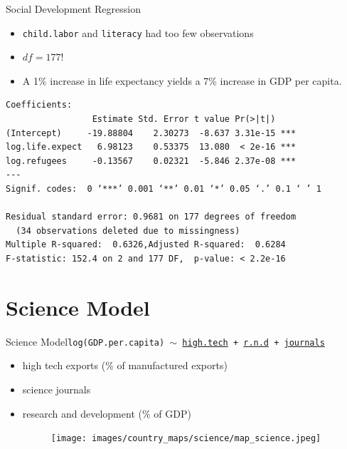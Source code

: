 \documentclass{beamer}
\begin{document}
\begin{frame}[fragile]{{\sc Social Development} Regression}
\small
\begin{itemize}
\item {\tt child.labor} and {\tt literacy} had too few observations
\item $df = 177$!
\item A 1\% increase in life expectancy yields a 7\% increase in GDP per capita.
\end{itemize}
\begin{verbatim}
Coefficients:
                 Estimate Std. Error t value Pr(>|t|)    
(Intercept)     -19.88804    2.30273  -8.637 3.31e-15 ***
log.life.expect   6.98123    0.53375  13.080  < 2e-16 ***
log.refugees     -0.13567    0.02321  -5.846 2.37e-08 ***
---
Signif. codes:  0 ‘***’ 0.001 ‘**’ 0.01 ‘*’ 0.05 ‘.’ 0.1 ‘ ’ 1

Residual standard error: 0.9681 on 177 degrees of freedom
  (34 observations deleted due to missingness)
Multiple R-squared:  0.6326,Adjusted R-squared:  0.6284 
F-statistic: 152.4 on 2 and 177 DF,  p-value: < 2.2e-16
\end{verbatim}

\end{frame}



\section{Science Model}

\begin{frame}{{\sc Science} Model}{\tt log(GDP.per.capita) $\sim$ \href{http://data.worldbank.org/indicator/TX.VAL.TECH.MF.ZS}{high.tech} + \href{http://data.worldbank.org/indicator/GB.XPD.RSDV.GD.ZS}{r.n.d} + \href{http://data.worldbank.org/indicator/IP.JRN.ARTC.SC}{journals}}
  \begin{itemize}
  \item high tech exports (\% of manufactured exports)
  \item science journals
  \item research and development (\% of GDP)
    \begin{figure}
      \centering
      \texttt{[image: images/country\_maps/science/map\_science.jpeg]}
    \end{figure}
    
  \end{itemize}
\end{frame}
\end{document}

